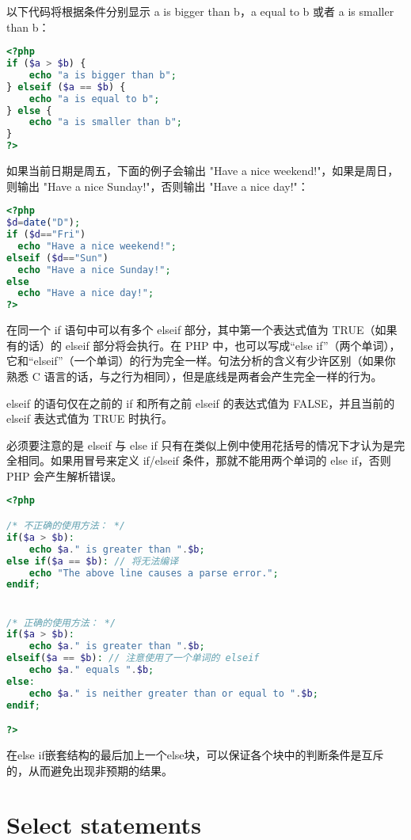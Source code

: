 以下代码将根据条件分别显示 a is bigger than b，a equal to b 或者 a is smaller than b：

\begin{lstlisting}[language=PHP]
<?php
if ($a > $b) {
    echo "a is bigger than b";
} elseif ($a == $b) {
    echo "a is equal to b";
} else {
    echo "a is smaller than b";
}
?>
\end{lstlisting}

如果当前日期是周五，下面的例子会输出 "Have a nice weekend!"，如果是周日，则输出 "Have a nice Sunday!"，否则输出 "Have a nice day!"：

\begin{lstlisting}[language=PHP]
<?php
$d=date("D");
if ($d=="Fri")
  echo "Have a nice weekend!"; 
elseif ($d=="Sun")
  echo "Have a nice Sunday!"; 
else
  echo "Have a nice day!"; 
?>
\end{lstlisting}

在同一个 if 语句中可以有多个 elseif 部分，其中第一个表达式值为 TRUE（如果有的话）的 elseif 部分将会执行。在 PHP 中，也可以写成“else if”（两个单词），它和“elseif”（一个单词）的行为完全一样。句法分析的含义有少许区别（如果你熟悉 C 语言的话，与之行为相同），但是底线是两者会产生完全一样的行为。

elseif 的语句仅在之前的 if 和所有之前 elseif 的表达式值为 FALSE，并且当前的 elseif 表达式值为 TRUE 时执行。

必须要注意的是 elseif 与 else if 只有在类似上例中使用花括号的情况下才认为是完全相同。如果用冒号来定义 if/elseif 条件，那就不能用两个单词的 else if，否则 PHP 会产生解析错误。

\begin{lstlisting}[language=PHP]
<?php

/* 不正确的使用方法： */
if($a > $b):
    echo $a." is greater than ".$b;
else if($a == $b): // 将无法编译
    echo "The above line causes a parse error.";
endif;


/* 正确的使用方法： */
if($a > $b):
    echo $a." is greater than ".$b;
elseif($a == $b): // 注意使用了一个单词的 elseif
    echo $a." equals ".$b;
else:
    echo $a." is neither greater than or equal to ".$b;
endif;

?>
\end{lstlisting}

在else if嵌套结构的最后加上一个else块，可以保证各个块中的判断条件是互斥的，从而避免出现非预期的结果。




\section{Select statements}

